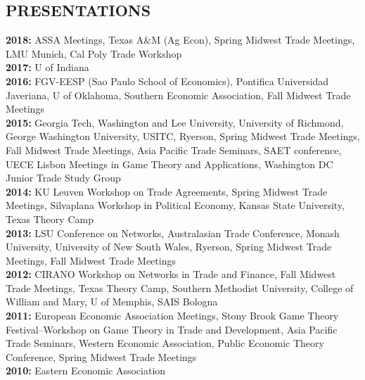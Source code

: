\documentclass[11pt]{res}
\begin{document}
\begin{resume}

\section{PRESENTATIONS}\vspace{1.5mm}
{\bf 2018:} ASSA Meetings, Texas A\&M (Ag Econ), Spring Midwest Trade Meetings, LMU Munich, Cal Poly Trade Workshop \vspace{1.5mm}\\
{\bf 2017:} U of Indiana \vspace{1.5mm}\\
{\bf 2016:} FGV-EESP (Sao Paulo School of Economics), Pontifica Universidad Javeriana, U of Oklahoma, Southern Economic Association, Fall Midwest Trade Meetings\vspace{1.5mm}\\
{\bf 2015:} Georgia Tech, Washington and Lee University, University of Richmond, George Washington University, USITC, Ryerson, Spring Midwest Trade Meetings, Fall Midwest Trade Meetings, Asia Pacific Trade Seminars, SAET conference, UECE Lisbon Meetings in Game Theory and Applications, Washington DC Junior Trade Study Group\vspace{1.5mm}\\
{\bf 2014:} KU Leuven Workshop on Trade Agreements, Spring Midwest Trade Meetings, Silvaplana Workshop in Political Economy, Kansas State University, Texas Theory Camp\vspace{1.5mm}\\
{\bf 2013:} LSU Conference on Networks, Australasian Trade Conference, Monash University, University of New South Wales, Ryerson, Spring Midwest Trade Meetings, Fall Midwest Trade Meetings \vspace{1.5mm}\\
{\bf 2012:}  CIRANO Workshop on Networks in Trade and Finance, Fall Midwest Trade Meetings, Texas Theory Camp, Southern Methodist University, College of William and Mary, U of Memphis, SAIS Bologna\vspace{1.5mm}\\
{\bf 2011:} European Economic Association Meetings, Stony Brook Game Theory Festival--Workshop on Game Theory in Trade and Development, Asia Pacific Trade Seminars, Western Economic Association, Public Economic Theory Conference, Spring Midwest Trade Meetings\vspace{1.5mm}\\
{\bf 2010:} Eastern Economic Association


\end{resume}
\end{document}
